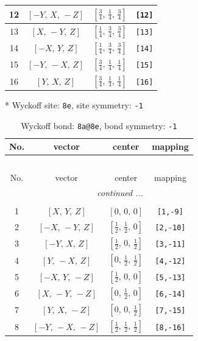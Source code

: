\documentclass[fleqn,8pt]{jsarticle}
\begin{document}
\begin{longtable}{cccc}
12 & $\left[ - Y,\, X,\, - Z \right]$ & $\left[ \frac{3}{4},\, \frac{1}{4},\, \frac{3}{4} \right]$ & {\tt [12]} \\ \hline
13 & $\left[ X,\, - Y,\, Z \right]$ & $\left[ \frac{1}{4},\, \frac{3}{4},\, \frac{3}{4} \right]$ & {\tt [13]} \\ \hline
14 & $\left[ - X,\, Y,\, Z \right]$ & $\left[ \frac{1}{4},\, \frac{3}{4},\, \frac{3}{4} \right]$ & {\tt [14]} \\ \hline
15 & $\left[ - Y,\, - X,\, Z \right]$ & $\left[ \frac{3}{4},\, \frac{1}{4},\, \frac{1}{4} \right]$ & {\tt [15]} \\ \hline
16 & $\left[ Y,\, X,\, Z \right]$ & $\left[ \frac{3}{4},\, \frac{1}{4},\, \frac{1}{4} \right]$ & {\tt [16]} \\
\end{longtable}
* Wyckoff site: {\tt 8e}, site symmetry: {\tt -1}
\renewcommand{\arraystretch}{1.2}
\begin{longtable}{cccc}
\caption{Wyckoff bond: {\tt 8a@8e}, bond symmetry: {\tt -1}}
 \\
 \hline \hline
No. & vector & center & mapping \\ \hline \endfirsthead

\multicolumn{3}{l}{\tablename\ \thetable{}} \\
 \hline \hline
No. & vector & center & mapping \\ \hline \endhead

 \hline \hline
\multicolumn{3}{r}{\footnotesize\it continued ...} \\ \endfoot

 \hline \hline
\multicolumn{3}{r}{} \\ \endlastfoot

1 & $\left[ X,\, Y,\, Z \right]$ & $\left[ 0,\, 0,\, 0 \right]$ & {\tt [1,-9]} \\ \hline
2 & $\left[ - X,\, - Y,\, Z \right]$ & $\left[ \frac{1}{2},\, \frac{1}{2},\, 0 \right]$ & {\tt [2,-10]} \\ \hline
3 & $\left[ - Y,\, X,\, Z \right]$ & $\left[ \frac{1}{2},\, 0,\, \frac{1}{2} \right]$ & {\tt [3,-11]} \\ \hline
4 & $\left[ Y,\, - X,\, Z \right]$ & $\left[ 0,\, \frac{1}{2},\, \frac{1}{2} \right]$ & {\tt [4,-12]} \\ \hline
5 & $\left[ - X,\, Y,\, - Z \right]$ & $\left[ \frac{1}{2},\, 0,\, 0 \right]$ & {\tt [5,-13]} \\ \hline
6 & $\left[ X,\, - Y,\, - Z \right]$ & $\left[ 0,\, \frac{1}{2},\, 0 \right]$ & {\tt [6,-14]} \\ \hline
7 & $\left[ Y,\, X,\, - Z \right]$ & $\left[ 0,\, 0,\, \frac{1}{2} \right]$ & {\tt [7,-15]} \\ \hline
8 & $\left[ - Y,\, - X,\, - Z \right]$ & $\left[ \frac{1}{2},\, \frac{1}{2},\, \frac{1}{2} \right]$ & {\tt [8,-16]} \\
\end{longtable}
\end{document}
